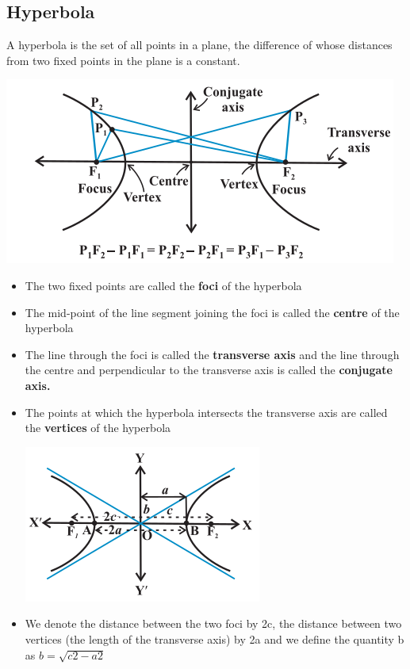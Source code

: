 \documentclass[12pt]{article}
\begin{document}
\begin{multicols}{2}
\subsection*{Hyperbola}
A hyperbola is the set of all points in a plane, the difference of whose
distances from two fixed points in the plane is a constant.
\begin{center}
    \includegraphics[scale=0.5]{f4.png}
\end{center}
\begin{itemize}
    \item The two fixed points are called the
    \textbf{foci} of the hyperbola
    \item The mid-point of the line segment joining the foci is called the
    \textbf{centre} of the hyperbola
    \item The line through the foci is called the \textbf{transverse axis} and
    the line through the centre and perpendicular to the transverse axis is called the \textbf{conjugate
    axis.}
    \item The points at which the hyperbola
    intersects the transverse axis are called the
    \textbf{vertices} of the hyperbola
    \begin{center}
        \includegraphics[scale=0.7]{f5.png}
    \end{center}
    \item We denote the distance between the
    two foci by 2c, the distance between two
    vertices (the length of the transverse axis)
    by 2a and we define the quantity b as
   $ b =\sqrt{
    c2 - a2}$
\end{itemize}

\end{multicols}
\end{document}
